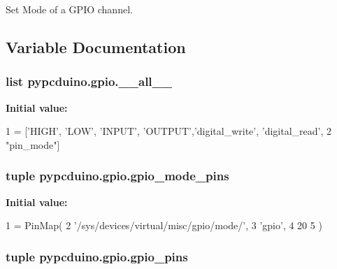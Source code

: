 Set Mode of a G\-P\-I\-O channel. 



\subsection{Variable Documentation}
\hypertarget{namespacepypcduino_1_1gpio_a8a55cdc8c6b775ffa9ba8aa68cfd8d93}{
\subsubsection[{\-\_\-\-\_\-all\-\_\-\-\_\-}]{\setlength{\rightskip}{0pt plus 5cm}list pypcduino.\-gpio.\-\_\-\-\_\-all\-\_\-\-\_\-}}\label{namespacepypcduino_1_1gpio_a8a55cdc8c6b775ffa9ba8aa68cfd8d93}
{\bfseries Initial value\-:}
\begin{DoxyCode}
1 = [\textcolor{stringliteral}{'HIGH'}, \textcolor{stringliteral}{'LOW'}, \textcolor{stringliteral}{'INPUT'}, \textcolor{stringliteral}{'OUTPUT'},\textcolor{stringliteral}{'digital\_write'}, \textcolor{stringliteral}{'digital\_read'},
2            \textcolor{stringliteral}{"pin\_mode"}]
\end{DoxyCode}
\hypertarget{namespacepypcduino_1_1gpio_a3e40fb727c6bb0d0f1bcf69478a9a1c0}{
\subsubsection[{gpio\-\_\-mode\-\_\-pins}]{\setlength{\rightskip}{0pt plus 5cm}tuple pypcduino.\-gpio.\-gpio\-\_\-mode\-\_\-pins}}\label{namespacepypcduino_1_1gpio_a3e40fb727c6bb0d0f1bcf69478a9a1c0}
{\bfseries Initial value\-:}
\begin{DoxyCode}
1 = PinMap(
2     \textcolor{stringliteral}{'/sys/devices/virtual/misc/gpio/mode/'},
3     \textcolor{stringliteral}{'gpio'},
4     20
5 )
\end{DoxyCode}
\hypertarget{namespacepypcduino_1_1gpio_acf2dcb151997749e99dbf65c08073e08}{
\subsubsection[{gpio\-\_\-pins}]{\setlength{\rightskip}{0pt plus 5cm}tuple pypcduino.\-gpio.\-gpio\-\_\-pins}}\label{namespacepypcduino_1_1gpio_acf2dcb151997749e99dbf65c08073e08}
